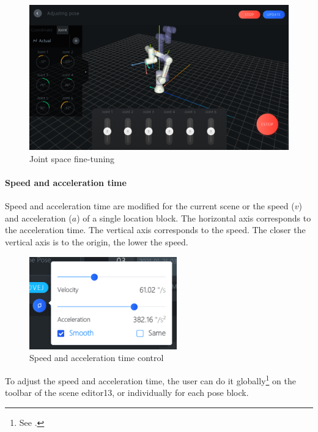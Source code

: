 \begin{figure}[ht]
	\centering
	\includegraphics[width=\textwidth]{en/image/joints.png}
	\caption{Joint space fine-tuning}
	\label{fig:关节空间微调}
\end{figure}

\paragraph{Speed and acceleration time}
Speed and acceleration time are modified for the current scene or the speed ($v$) and acceleration ($a$) of a single location block. The horizontal axis corresponds to the acceleration time. The vertical axis corresponds to the speed. The closer the vertical axis is to the origin, the lower the speed.

\begin{figure}[ht]
	\centering
	\includegraphics[height=4cm]{en/image/3-11.png}
	\caption{Speed and acceleration time control}
	\label{fig:速度与加速时间}
\end{figure}

To adjust the speed and acceleration time, the user can do it globally\footnote{See .} on the toolbar of the scene editor13, or individually for each pose block.

